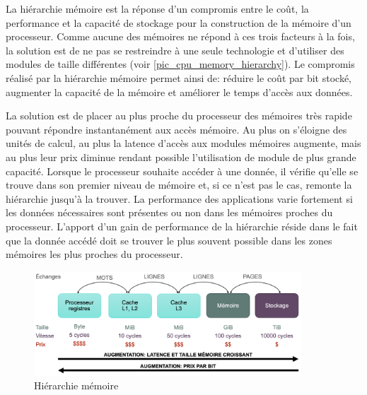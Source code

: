 La hiérarchie mémoire est la réponse d'un compromis entre le coût, la performance et la capacité de stockage pour la construction de la mémoire d'un processeur. Comme aucune des mémoires ne répond à ces trois facteurs à la fois, la solution est de ne pas se restreindre à  une seule technologie et d'utiliser des modules de taille différentes (voir \autoref{pic_cpu_memory_hierarchy}). Le compromis réalisé par la hiérarchie mémoire permet ainsi de: réduire le coût par bit stocké, augmenter la capacité de la mémoire et améliorer le temps d'accès aux données. 

La solution est de placer au plus proche du processeur des mémoires très rapide pouvant répondre instantanément aux accès mémoire. Au plus on s'éloigne des unités de calcul, au plus la latence d'accès aux modules mémoires augmente, mais au plus leur prix diminue rendant possible l'utilisation de module de plus grande capacité. Lorsque le processeur souhaite accéder à une donnée, il vérifie qu'elle se trouve dans son premier niveau de mémoire et, si ce n'est pas le cas, remonte la hiérarchie jusqu'à la trouver. La performance des applications varie fortement si les données nécessaires sont présentes ou non dans les mémoires proches du processeur. L'apport d'un gain de performance de la hiérarchie réside dans le fait que la donnée accédé doit se trouver le plus souvent possible dans les zones mémoires les plus proches du processeur.


\begin{figure}
    \center
    \includegraphics[width=10cm]{images/cpu_memory_hierarchy.png}
    \caption{\label{pic_cpu_memory_hierarchy} Hiérarchie mémoire}
\end{figure}

